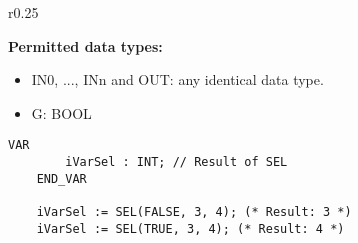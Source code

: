 \begin{wraptable}{r}{0.25 \textwidth} %
	\centering
	\vspace{-25pt} %
\end{wraptable}

\textbf{Permitted data types:}
\begin{itemize}
	\item IN0, ..., INn and OUT: any identical data type. %
	\item G: BOOL
\end{itemize}



\begin{lstlisting}[language=ST]
	VAR
		iVarSel : INT; // Result of SEL
	END_VAR
	
	iVarSel := SEL(FALSE, 3, 4); (* Result: 3 *)
	iVarSel := SEL(TRUE, 3, 4); (* Result: 4 *)
\end{lstlisting}


